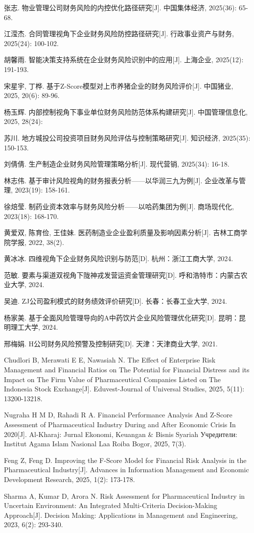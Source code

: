 \documentclass[12pt,a4paper,fontset=windows,UTF8]{ctexart}
\begin{document}
\begin{thesref}
  \item 张志. 物业管理公司财务风险的内控优化路径研究[J]. 中国集体经济, 2025(36): 65-68.
  \item 江滢杰. 合同管理视角下企业财务风险防控路径研究[J]. 行政事业资产与财务, 2025(24): 100-102.
  \item 胡馨雨. 智能决策支持系统在企业财务风险识别中的应用[J]. 上海企业, 2025(12): 191-193.
  \item 宋星宇, 丁桦. 基于Z-Score模型对上市养猪企业的财务风险评价[J]. 中国猪业, 2025, 20(6): 89-96.
  \item 杨玉辉. 内部控制视角下事业单位财务风险防范体系构建研究[J]. 中国管理信息化, 2025, 28(24):
  \item 苏川. 地方城投公司投资项目财务风险评估与控制策略研究[J]. 知识经济, 2025(35): 150-153.
  \item 刘倩倩. 生产制造企业财务风险管理策略分析[J]. 现代营销, 2025(34): 16-18.
  \item 林志伟. 基于审计风险视角的财务报表分析——以华润三九为例[J]. 企业改革与管理, 2023(19): 158-161.
  \item 徐焙莹. 制药业资本效率与财务风险分析——以哈药集团为例[J]. 商场现代化, 2023(18): 168-170.
  \item 黄爱双, 陈育俭, 王佳妹. 医药制造业企业盈利质量及影响因素分析[J]. 吉林工商学院学报, 2022, 38(2).
  \item 黄冰冰. 四维视角下企业财务风险识别与防范[D]. 杭州：浙江工商大学, 2024.
  \item 范敏. 要素与渠道双视角下陇神戎发营运资金管理研究[D]. 呼和浩特市：内蒙古农业大学, 2024.
  \item 吴迪. ZJ公司盈利模式的财务绩效评价研究[D]. 长春：长春工业大学, 2024.
  \item 杨家美. 基于全面风险管理导向的A中药饮片企业风险管理优化研究[D]. 昆明：昆明理工大学, 2024.
  \item 邢梅娟. H公司财务风险预警及控制研究[D]. 天津：天津商业大学, 2021.
  \item Chudlori B, Merawati E E, Nawasiah N. The Effect of Enterprise Risk Management and Financial Ratios on The Potential for Financial Distress and its Impact on The Firm Value of Pharmaceutical Companies Listed on The Indonesia Stock Exchange[J]. Eduvest-Journal of Universal Studies, 2025, 5(11): 13200-13218.
  \item Nugraha H M D, Rahadi R A. Financial Performance Analysis And Z-Score Assessment of Pharmaceutical Industry During and After Economic Crisis In 2020[J]. Al-Kharaj: Jurnal Ekonomi, Keuangan \& Bisnis Syariah Учредители: Institut Agama Islam Nasional Laa Roiba Bogor, 2025, 7(3).
  \item Feng Z, Feng D. Improving the F-Score Model for Financial Risk Analysis in the Pharmaceutical Industry[J]. Advances in Information Management and Economic Development Research, 2025, 1(2): 173-178.
  \item Sharma A, Kumar D, Arora N. Risk Assessment for Pharmaceutical Industry in Uncertain Environment: An Integrated Multi-Criteria Decision-Making Approach[J]. Decision Making: Applications in Management and Engineering, 2023, 6(2): 293-340.
\end{thesref}
\end{document}
